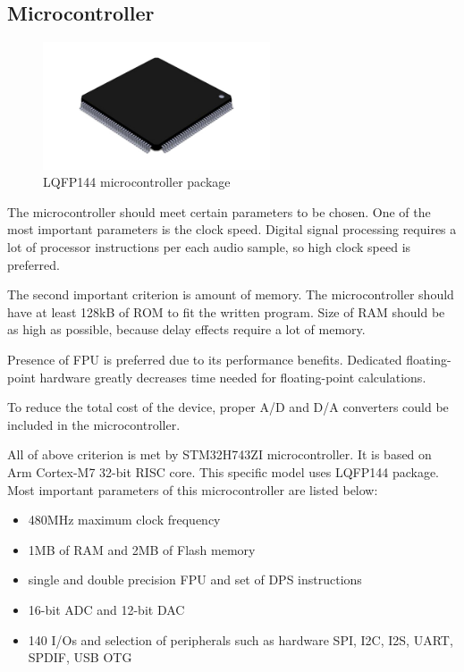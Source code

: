 \documentclass[a4paper,twoside,12pt]{book}
\begin{document}
\subsection {Microcontroller}

\begin{figure}[H]
    \centering
    \includegraphics[width=0.6\textwidth]{images/lqfp}
    \caption{LQFP144 microcontroller package}
    \label{fig:LQFP}
\end{figure}

The microcontroller should meet certain parameters to be chosen.
One of the most important parameters is the clock speed.
Digital signal processing requires a lot of processor instructions
per each audio sample, so high clock speed is preferred.

The second important criterion is amount of memory.
The microcontroller should have at least 128kB of ROM
to fit the written program.
Size of RAM should be as high as possible,
because delay effects require a lot of memory.

Presence of FPU is preferred due to its performance benefits.
Dedicated floating-point hardware greatly decreases time
needed for floating-point calculations.

To reduce the total cost of the device,
proper A/D and D/A converters could be included in the microcontroller.

All of above criterion is met by STM32H743ZI microcontroller.
\cite{ST:RM}
It is based on Arm Cortex-M7 32-bit RISC core.
This specific model uses LQFP144 package.
Most important parameters of this microcontroller are listed below:
\begin{itemize}
    \item 480MHz maximum clock frequency
    \item 1MB of RAM and 2MB of Flash memory
    \item single and double precision FPU and set of DPS instructions
    \item 16-bit ADC and 12-bit DAC
    \item 140 I/Os and selection of peripherals such as hardware
    SPI, I2C, I2S, UART, SPDIF, USB OTG
\end{itemize}
\end{document}

